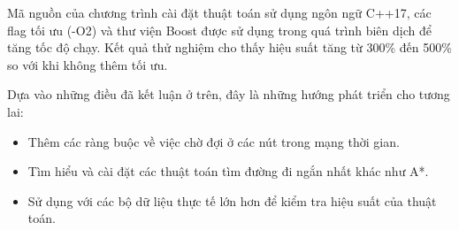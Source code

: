 \documentclass[../main.tex]{subfiles}
\begin{document}
Mã nguồn của chương trình cài đặt thuật toán sử dụng ngôn ngữ C++17, các flag tối ưu (-O2) và thư viện Boost được sử dụng trong quá trình biên dịch để tăng tốc độ chạy. Kết quả thử nghiệm cho thấy hiệu suất tăng từ 300\% đến 500\% so với khi không thêm tối ưu. 

Dựa vào những điều đã kết luận ở trên, đây là những hướng phát triển cho tương lai:

\begin{itemize}
    \item Thêm các ràng buộc về việc chờ đợi ở các nút trong mạng thời gian.
    \item Tìm hiểu và cài đặt các thuật toán tìm đường đi ngắn nhất khác như A*.
    \item Sử dụng với các bộ dữ liệu thực tế lớn hơn để kiểm tra hiệu suất của thuật toán.
\end{itemize}
\end{document}
